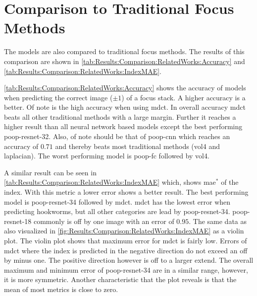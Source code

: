 \FloatBarrier

\section{Comparison to Traditional Focus Methods}
\label{sec:Results:TraditionalFocusMethods}

The models are also compared to traditional focus methods. The results of this comparison are shown in \autoref{tab:Results:Comparison:RelatedWorks:Accuracy} and \autoref{tab:Results:Comparison:RelatedWorks:IndexMAE}.

\autoref{tab:Results:Comparison:RelatedWorks:Accuracy} shows the accuracy of models when predicting the correct image ($\pm 1$) of a focus stack. A higher accuracy is a better. Of note is the high accuracy when using \ac{mdct}. In overall accuracy \ac{mdct} beats all other traditional methods with a large margin. Further it reaches a higher result than all neural network based models except the best performing \acs{poop}-\acs{resnet}-32. Also, of note should be that of \acs{poop}-\acs{cnn} which reaches an accuracy of $0.71$ and thereby beats most traditional methods (\ac{vol4} and \ac{laplacian}). The worst performing model is \acs{poop}-\acs{fc} followed by \ac{vol4}.

A similar result can be seen in \autoref{tab:Results:Comparison:RelatedWorks:IndexMAE} which, shows \ac{mae}$^*$ of the index. With this metric a lower error shows a better result. The best performing model is \acs{poop}-\acs{resnet}-34 followed by \acs{mdct}. \Acs{mdct} has the lowest error when predicting hookworms, but all other categories are lead by \acs{poop}-\acs{resnet}-34. \Acs{poop}-\acs{resnet}-18 commonly is off by one image with an error of $0.95$. The same data as also visualized in \autoref{fig:Results:Comparison:RelatedWorks:IndexMAE} as a violin plot. The violin plot shows that maximum error for \ac{mdct} is fairly low. Errors of \ac{mdct} where the index is predicted in the negative direction do not exceed an off by minus one. The positive direction however is off to a larger extend. The overall maximum and minimum error of \acs{poop}-\acs{resnet}-34 are in a similar range, however, it is more symmetric. Another characteristic that the plot reveals is that the mean of most metrics is close to zero.


